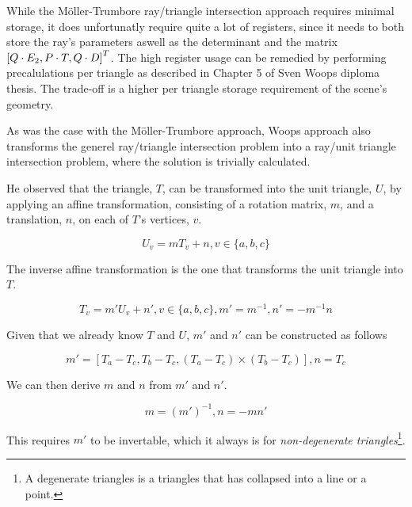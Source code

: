 
While the Möller-Trumbore ray/triangle intersection approach requires
minimal storage, it does unfortunatly require quite a lot of
registers, since it needs to both store the ray's parameters aswell as
the determinant and the matrix $\left[Q \cdot E_2, P \cdot T, Q
  \cdot D \right]^T$. The high register usage can be remedied by performing
precalulations per triangle as described in Chapter 5 of Sven Woops
diploma thesis. The trade-off is a higher per
triangle storage requirement of the scene's geometry.


As was the case with the Möller-Trumbore approach, Woops approach also
transforms the generel ray/triangle intersection problem into a
ray/unit triangle intersection problem, where the solution is
trivially calculated.

He observed that the triangle, $T$, can be transformed into the unit
triangle, $U$, by applying an affine transformation, consisting of a rotation
matrix, $m$, and a translation, $n$, on each of $T$'s vertices, $v$.

\begin{displaymath}
  U_v = m T_v + n, v \in \{a, b, c\}
\end{displaymath}

The inverse affine transformation is the one that transforms the unit
triangle into $T$.

\begin{displaymath}
  T_v = m' U_v + n', v \in \{a, b, c\}, m' = m^{-1}, n' = -m^{-1}n
\end{displaymath}

Given that we already know $T$ and $U$, $m'$ and $n'$ can be
constructed as follows

\begin{displaymath}
  m' = \left[ T_a - T_c, T_b - T_c, (T_a - T_c) \times (T_b - T_c)
    \right],
  n = T_c
\end{displaymath}

We can then derive $m$ and $n$ from $m'$ and $n'$. 

\begin{displaymath}
  m = (m')^{-1},
  n = - m n'
\end{displaymath}

This requires $m'$ to be invertable, which it always is for
\textit{non-degenerate triangles}\footnote{A degenerate triangles is
  a triangles that has collapsed into a line or a point.}.

